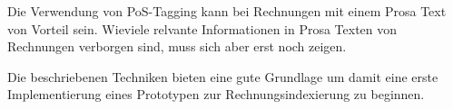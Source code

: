 \documentclass{hwz}
\begin{document}

Die Verwendung von PoS-Tagging kann bei Rechnungen mit einem Prosa Text von Vorteil sein. Wieviele relvante Informationen in Prosa Texten von Rechnungen verborgen sind, muss sich aber erst noch zeigen.

Die beschriebenen Techniken bieten eine gute Grundlage um damit eine erste Implementierung eines Prototypen zur Rechnungsindexierung zu beginnen.






\end{document}
